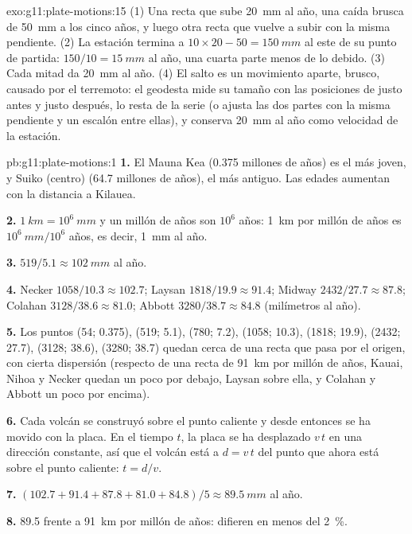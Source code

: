 \begin{solution}{exo:g11:plate-motions:15}
(1) Una recta que sube \qty{20}{mm} al año, una caída brusca de
\qty{50}{mm} a los cinco años, y luego otra recta que vuelve a subir con la
misma pendiente. (2) La estación termina a $10 \times 20 - 50 = \qty{150}{mm}$
al este de su punto de partida: $150/10 = \qty{15}{mm}$ al año, una cuarta
parte menos de lo debido. (3) Cada mitad da \qty{20}{mm} al año. (4) El salto
es un movimiento aparte, brusco, causado por el terremoto: el geodesta mide su
tamaño con las posiciones de justo antes y justo después, lo resta de la serie
(o ajusta las dos partes con la misma pendiente y un escalón entre ellas), y
conserva \qty{20}{mm} al año como velocidad de la estación.
\end{solution}

\begin{solution}{pb:g11:plate-motions:1}
\textbf{1.} El Mauna Kea (\num{0.375} millones de años) es el más joven, y
Suiko (centro) (\num{64.7} millones de años), el más antiguo. Las edades
aumentan con la distancia a Kilauea.

\textbf{2.} $\qty{1}{km} = 10^6~\unit{mm}$ y un millón de años son $10^6$
años: \qty{1}{km} por millón de años es $10^6~\unit{mm}/10^6$ años, es decir,
\qty{1}{mm} al año.

\textbf{3.} $519/5.1 \approx \qty{102}{mm}$ al año.

\textbf{4.} Necker $1058/10.3 \approx 102.7$; Laysan $1818/19.9 \approx
91.4$; Midway $2432/27.7 \approx 87.8$; Colahan $3128/38.6 \approx 81.0$;
Abbott $3280/38.7 \approx 84.8$ (milímetros al año).

\textbf{5.} Los puntos (54; 0.375), (519; 5.1), (780; 7.2), (1058; 10.3),
(1818; 19.9), (2432; 27.7), (3128; 38.6), (3280; 38.7) quedan cerca de una
recta que pasa por el origen, con cierta dispersión (respecto de una recta de
\qty{91}{km} por millón de años, Kauai, Nihoa y Necker quedan un poco por
debajo, Laysan sobre ella, y Colahan y Abbott un poco por encima).

\textbf{6.} Cada volcán se construyó sobre el punto caliente y desde entonces
se ha movido con la placa. En el tiempo $t$, la placa se ha desplazado $v\,t$
en una dirección constante, así que el volcán está a $d = v\,t$ del punto que
ahora está sobre el punto caliente: $t = d/v$.

\textbf{7.} $(102.7 + 91.4 + 87.8 + 81.0 + 84.8)/5 \approx \qty{89.5}{mm}$ al
año.

\textbf{8.} 89.5 frente a \qty{91}{km} por millón de años: difieren en menos
del \qty{2}{\percent}.


\end{solution}
